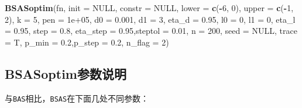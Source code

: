 \documentclass[]{ctexbook}
\newenvironment{Shaded}{\begin{snugshade}}{\end{snugshade}}
\newcommand{\KeywordTok}[1]{\textcolor[rgb]{0.13,0.29,0.53}{\textbf{#1}}}
\newcommand{\DataTypeTok}[1]{\textcolor[rgb]{0.13,0.29,0.53}{#1}}
\newcommand{\DecValTok}[1]{\textcolor[rgb]{0.00,0.00,0.81}{#1}}
\newcommand{\FloatTok}[1]{\textcolor[rgb]{0.00,0.00,0.81}{#1}}
\newcommand{\OtherTok}[1]{\textcolor[rgb]{0.56,0.35,0.01}{#1}}
\newcommand{\OperatorTok}[1]{\textcolor[rgb]{0.81,0.36,0.00}{\textbf{#1}}}
\newcommand{\NormalTok}[1]{#1}
\theoremstyle{definition}
\theoremstyle{definition}
\theoremstyle{definition}
\theoremstyle{remark}
\begin{document}
\begin{Shaded}
\begin{Highlighting}[]
\KeywordTok{BSASoptim}\NormalTok{(fn, }
          \DataTypeTok{init =} \OtherTok{NULL}\NormalTok{, }\DataTypeTok{constr =} \OtherTok{NULL}\NormalTok{, }
          \DataTypeTok{lower =} \KeywordTok{c}\NormalTok{(}\OperatorTok{-}\DecValTok{6}\NormalTok{, }\DecValTok{0}\NormalTok{), }\DataTypeTok{upper =} \KeywordTok{c}\NormalTok{(}\OperatorTok{-}\DecValTok{1}\NormalTok{, }\DecValTok{2}\NormalTok{),}
          \DataTypeTok{k =} \DecValTok{5}\NormalTok{, }\DataTypeTok{pen =} \FloatTok{1e+05}\NormalTok{,}
          \DataTypeTok{d0 =} \FloatTok{0.001}\NormalTok{, }\DataTypeTok{d1 =} \DecValTok{3}\NormalTok{, }\DataTypeTok{eta_d =} \FloatTok{0.95}\NormalTok{,}
          \DataTypeTok{l0 =} \DecValTok{0}\NormalTok{, }\DataTypeTok{l1 =} \DecValTok{0}\NormalTok{, }\DataTypeTok{eta_l =} \FloatTok{0.95}\NormalTok{, }
          \DataTypeTok{step =} \FloatTok{0.8}\NormalTok{, }\DataTypeTok{eta_step =} \FloatTok{0.95}\NormalTok{,}\DataTypeTok{steptol =} \FloatTok{0.01}\NormalTok{,}
          \DataTypeTok{n =} \DecValTok{200}\NormalTok{, }\DataTypeTok{seed =} \OtherTok{NULL}\NormalTok{, }\DataTypeTok{trace =}\NormalTok{ T,  }
          \DataTypeTok{p_min =} \FloatTok{0.2}\NormalTok{,}\DataTypeTok{p_step =} \FloatTok{0.2}\NormalTok{, }\DataTypeTok{n_flag =} \DecValTok{2}\NormalTok{)}
\end{Highlighting}
\end{Shaded}

\subsection{BSASoptim参数说明}\label{BSASparms}

与\texttt{BAS}相比，\texttt{BSAS}在下面几处不同参数：
\end{document}

